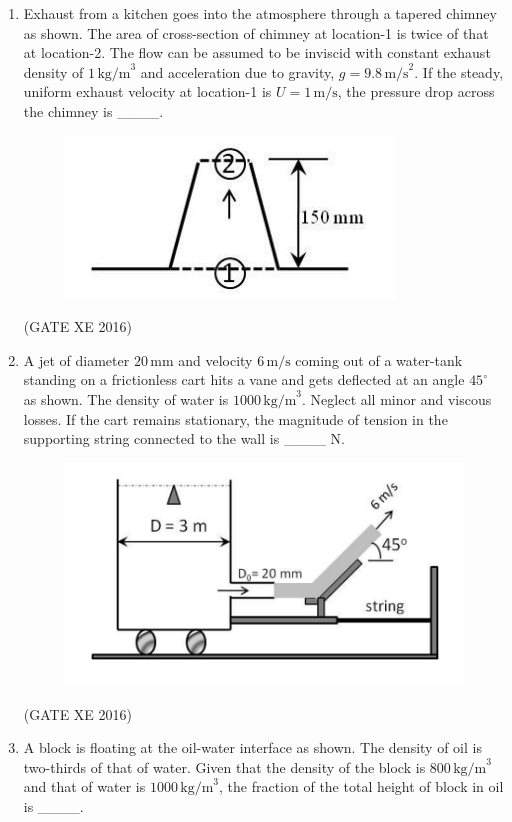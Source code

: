 \documentclass[12pt]{article}
\begin{document}
\begin{enumerate}
\item Exhaust from a kitchen goes into the atmosphere through a tapered chimney as shown. 
The area of cross-section of chimney at location-1 is twice of that at location-2. 
The flow can be assumed to be inviscid with constant exhaust density of $1 \, \text{kg/m}^3$ and acceleration due to gravity, $g = 9.8 \, \text{m/s}^2$. 
If the steady, uniform exhaust velocity at location-1 is $U = 1 \, \text{m/s}$, the pressure drop across the chimney is \_\_\_\_.  

\begin{figure}[H]
    \centering
    \includegraphics[width=0.5\columnwidth]{figs/ass3_b_q10.png}
    \caption{}
    \label{fig:placeholder}
\end{figure}

(GATE XE 2016)

\item A jet of diameter $20 \, \text{mm}$ and velocity $6 \, \text{m/s}$ coming out of a water-tank standing on a frictionless cart hits a vane and gets deflected at an angle $45^\circ$ as shown. 
The density of water is $1000 \, \text{kg/m}^3$. Neglect all minor and viscous losses. 
If the cart remains stationary, the magnitude of tension in the supporting string connected to the wall is \_\_\_\_ N.  

\begin{figure}[H]
    \centering
    \includegraphics[width=0.5\columnwidth]{figs/ass3_b_q11.png}
    \caption{}
    \label{fig:placeholder}
\end{figure}

(GATE XE 2016)

\item A block is floating at the oil-water interface as shown. The density of oil is two-thirds of that of water. Given that the density of the block is $800 \, \text{kg/m}^3$ and that of water is $1000 \, \text{kg/m}^3$, the fraction of the total height of block in oil is \_\_\_\_.  


\end{enumerate}
\end{document}
